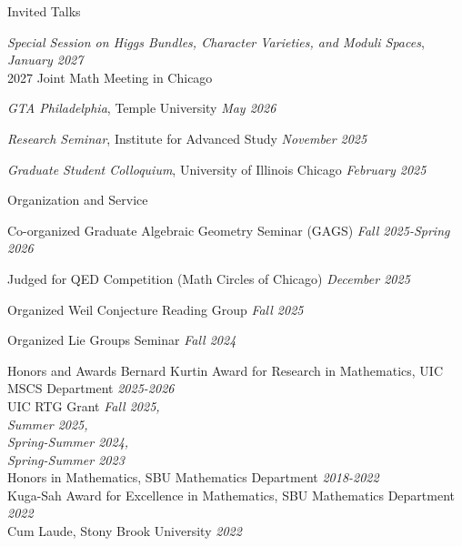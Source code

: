 \documentclass{resume} %
\begin{document}
\begin{rSection}{Invited Talks}
\begin{etaremune}
\item \textit{Special Session on Higgs Bundles, Character Varieties, and Moduli Spaces}, 
\hfill \textit{January 2027}\\ %
2027 Joint Math Meeting in Chicago
\item \textit{GTA Philadelphia}, Temple University \hfill \textit{May 2026}
\item \textit{Research Seminar}, Institute for Advanced Study \hfill \textit{November 2025}
\item \textit{Graduate Student Colloquium}, University of Illinois Chicago \hfill \textit{February 2025}
\end{etaremune}

\end{rSection}





\begin{rSection}{Organization and Service}
\begin{etaremune}
\item {Co-organized Graduate Algebraic Geometry Seminar (GAGS)} \hfill \textit{Fall 2025-Spring 2026} 
\item {Judged for QED Competition (Math Circles of Chicago)} \hfill \textit{December 2025}
\item {Organized Weil Conjecture Reading Group} \hfill \textit{Fall 2025} 
\item {Organized Lie Groups Seminar} \hfill \textit{Fall 2024}
\end{etaremune}


\end{rSection}



\begin{rSection}{Honors and Awards}
{Bernard Kurtin Award for Research in Mathematics, UIC MSCS Department} 
\hfill \textit{2025-2026} \\
{UIC RTG Grant} \hfill \textit{Fall 2025,} \\
\mbox{} \hfill \textit{Summer 2025,} \\
\mbox{} \hfill \textit{Spring-Summer 2024,} \\
\mbox{} \hfill \textit{Spring-Summer 2023} \\
{Honors in Mathematics, SBU Mathematics Department} \hfill {\em 2018-2022} \\
{Kuga-Sah Award for Excellence in Mathematics, SBU Mathematics Department} 
\hfill {\em 2022} \\
{Cum Laude, Stony Brook University} \hfill {\em 2022}
\end{rSection}
\end{document}
